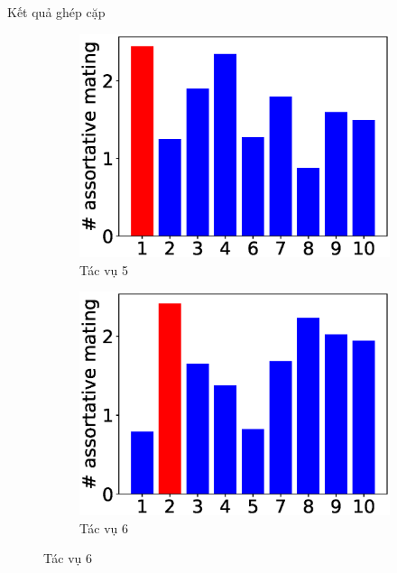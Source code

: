     \begin{frame}{Kết quả ghép cặp}
        \begin{figure}
            \centering
            \begin{subfigure}[b]{0.245\linewidth}
                \centering
                \includegraphics[width=\linewidth]{figure/experiment/bar10/5.eps}
                \caption{Tác vụ 5}
                \label{fig:bar10-5}
            \end{subfigure}
            \hfill
            \begin{subfigure}[b]{0.245\linewidth}
                \centering
                \includegraphics[width=\linewidth]{figure/experiment/bar10/6.eps}
                \caption{Tác vụ 6}
                \label{fig:bar10-6}
            \end{subfigure}

\end{figure}
\end{frame}

